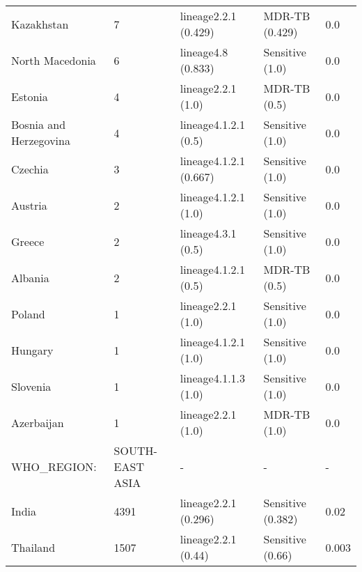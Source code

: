\begin{tabular}{lllll}
 Kazakhstan                                   & 7                     & lineage2.2.1 (0.429)     & MDR-TB (0.429)      & 0.0        \\
 North Macedonia                              & 6                     & lineage4.8 (0.833)       & Sensitive (1.0)     & 0.0        \\
 Estonia                                      & 4                     & lineage2.2.1 (1.0)       & MDR-TB (0.5)        & 0.0        \\
 Bosnia and Herzegovina                       & 4                     & lineage4.1.2.1 (0.5)     & Sensitive (1.0)     & 0.0        \\
 Czechia                                      & 3                     & lineage4.1.2.1 (0.667)   & Sensitive (1.0)     & 0.0        \\
 Austria                                      & 2                     & lineage4.1.2.1 (1.0)     & Sensitive (1.0)     & 0.0        \\
 Greece                                       & 2                     & lineage4.3.1 (0.5)       & Sensitive (1.0)     & 0.0        \\
 Albania                                      & 2                     & lineage4.1.2.1 (0.5)     & MDR-TB (0.5)        & 0.0        \\
 Poland                                       & 1                     & lineage2.2.1 (1.0)       & Sensitive (1.0)     & 0.0        \\
 Hungary                                      & 1                     & lineage4.1.2.1 (1.0)     & Sensitive (1.0)     & 0.0        \\
 Slovenia                                     & 1                     & lineage4.1.1.3 (1.0)     & Sensitive (1.0)     & 0.0        \\
 Azerbaijan                                   & 1                     & lineage2.2.1 (1.0)       & MDR-TB (1.0)        & 0.0        \\
 WHO\_REGION:                                  & SOUTH-EAST ASIA       & -                        & -                   & -          \\
 India                                        & 4391                  & lineage2.2.1 (0.296)     & Sensitive (0.382)   & 0.02       \\
 Thailand                                     & 1507                  & lineage2.2.1 (0.44)      & Sensitive (0.66)    & 0.003      \\

\end{tabular}
